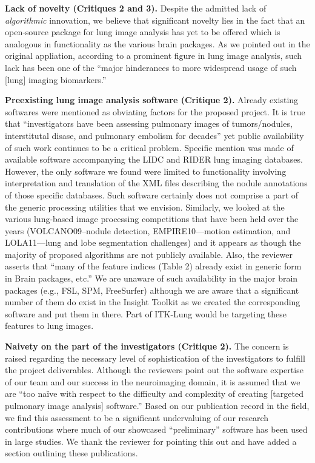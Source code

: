 \documentclass[11pt,]{article}
\begin{document}
\textbf{Lack of novelty (Critiques 2 and 3).} Despite the admitted lack
of \emph{algorithmic} innovation, we believe that significant novelty
lies in the fact that an open-source package for lung image analysis has
yet to be offered which is analogous in functionality as the various
brain packages. As we pointed out in the original appliation, according
to a prominent figure in lung image analysis, such lack has been one of
the ``major hinderances to more widespread usage of such {[}lung{]}
imaging biomarkers.''

\textbf{Preexisting lung image analysis software (Critique 2).} Already
existing softwares were mentioned as obviating factors for the proposed
project. It is true that ``investigators have been assessing pulmonary
images of tumors/nodules, interstitutal disase, and pulmonary embolism
for decades'' yet public availability of such work continues to be a
critical problem. Specific mention was made of available software
accompanying the LIDC and RIDER lung imaging databases. However, the
only software we found were limited to functionality involving
interpretation and translation of the XML files describing the nodule
annotations of those specific databases. Such software certainly does
not comprise a part of the generic processing utilities that we
envision. Similarly, we looked at the various lung-based image
processing competitions that have been held over the years
(VOLCANO09--nodule detection, EMPIRE10---motion estimation, and
LOLA11---lung and lobe segmentation challenges) and it appears as though
the majority of proposed algorithms are not publicly available. Also,
the reviewer asserts that ``many of the feature indices (Table 2)
already exist in generic form in Brain packages, etc.'' We are unaware
of such availability in the major brain packages (e.g., FSL, SPM,
FreeSurfer) although we are aware that a significant number of them do
exist in the Insight Toolkit as we created the corresponding software
and put them in there. Part of ITK-Lung would be targeting these
features to lung images.

\textbf{Naivety on the part of the investigators (Critique 2).} The
concern is raised regarding the necessary level of sophistication of the
investigators to fulfill the project deliverables. Although the
reviewers point out the software expertise of our team and our success
in the neuroimaging domain, it is assumed that we are ``too naïve with
respect to the difficulty and complexity of creating {[}targeted
pulmonary image analysis{]} software.'' Based on our publication record
in the field, we find this assessment to be a significant undervaluing
of our research contributions where much of our showcased
``preliminary'' software has been used in large studies. We thank the
reviewer for pointing this out and have added a section outlining these
publications.
\end{document}
